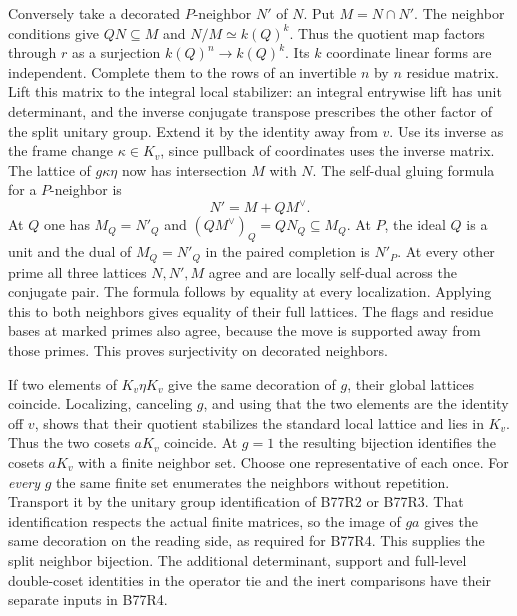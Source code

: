 Conversely take a decorated $P$-neighbor $N'$ of $N$. Put
$M=N\cap N'$. The neighbor conditions give $Q N\subseteq M$
and $N/M\simeq k(Q)^k$. Thus the quotient map factors through
$r$ as a surjection $k(Q)^n\to k(Q)^k$. Its $k$ coordinate
linear forms are independent. Complete them to the rows of an
invertible $n$ by $n$ residue matrix. Lift this matrix to the
integral local stabilizer: an integral entrywise lift has unit
determinant, and the inverse conjugate transpose prescribes
the other factor of the split unitary group. Extend it by the
identity away from $v$. Use its inverse as the frame change
$\kappa\in K_v$, since pullback of coordinates uses the inverse
matrix. The lattice of $g\kappa\eta$ now has intersection $M$
with $N$. The self-dual gluing formula for a $P$-neighbor is
\[
                    N'=M+Q M^\vee .
\]
At $Q$ one has $M_Q=N'_Q$ and
$(QM^\vee)_Q=Q N_Q\subseteq M_Q$. At $P$, the ideal $Q$ is a
unit and the dual of $M_Q=N'_Q$ in the paired completion is $N'_P$.
At every other prime all three lattices $N,N',M$ agree and are
locally self-dual across the conjugate pair. The formula follows
by equality at every localization. Applying this to both neighbors
gives equality of their full lattices. The flags and residue bases
at marked primes also agree, because the move is supported away
from those primes. This proves surjectivity on decorated neighbors.

If two elements of $K_v\eta K_v$ give the same decoration of $g$,
their global lattices coincide. Localizing, canceling $g$, and
using that the two elements are the identity off $v$, shows that
their quotient stabilizes the standard local lattice and lies in
$K_v$. Thus the two cosets $aK_v$ coincide. At $g=1$ the resulting
bijection identifies the cosets $aK_v$ with a finite neighbor set.
Choose one representative of each once. For \emph{every} $g$ the
same finite set enumerates the neighbors without repetition.
Transport it by the unitary group identification of B77R2 or
B77R3. That identification respects the actual finite matrices,
so the image of $g a$ gives the same decoration on the reading
side, as required for B77R4. This supplies the split neighbor
bijection. The additional determinant, support and full-level
double-coset identities in the operator tie and the inert
comparisons have their separate inputs in B77R4.
